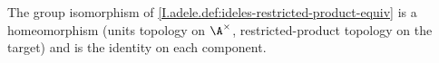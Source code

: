 The group isomorphism of \cref{I.adele.def:ideles-restricted-product-equiv} is a homeomorphism (units topology on $\A^\times$, restricted-product topology on the target) and is the identity on each component.
